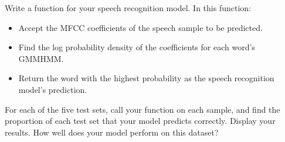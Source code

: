 \begin{problem}
Write a  function for your speech recognition model.
In this function:
\begin{itemize}
\item Accept the MFCC coefficients of the speech sample to be predicted.
\item Find the log probability density of the coefficients for each word's GMMHMM.
\item Return the word with the highest probability as the speech recognition model's prediction.
\end{itemize}
\end{problem}

\begin{problem}
For each of the five test sets, call your  function on each sample, and find the proportion of each test set that your model predicts correctly.
Display your results.
How well does your model perform on this dataset?
\end{problem}